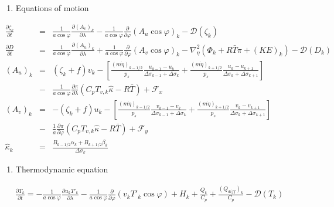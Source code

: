 \begin{enumerate}
\def\labelenumi{\arabic{enumi}.}
\setcounter{enumi}{2}
\tightlist
\item
  Equations of motion
\end{enumerate}
\begin{eqnarray}
  \frac{\partial \zeta_k}{\partial t} 
        &=&   \frac{1}{a\cos\varphi} 
            \frac{\partial (A_v)_k}{\partial \lambda}
          - \frac{1}{a\cos\varphi} 
            \frac{\partial }{\partial \varphi} (A_u \cos\varphi)_k
          - {\mathcal D}(\zeta_k) \\
  \frac{\partial D}{\partial t} 
        &=&   \frac{1}{a\cos\varphi} 
            \frac{\partial (A_u)_k}{\partial \lambda}
          + \frac{1}{a\cos\varphi} 
            \frac{\partial }{\partial \varphi} (A_v \cos\varphi)_k
          - \nabla^{2}_{\eta}
           ( \Phi_k + R\bar{T} \pi 
             + ({\mathit KE})_k )
          - {\mathcal D}(D_k) \\
  (A_u)_k
    &=&  ( \zeta_k + f ) v_k 
             - \left[ \frac{(m\dot{\eta})_{k-1/2}}{p_s} \frac{u_{k-1} - u_k}{\Delta\sigma_{k-1}+\Delta\sigma_k}
               + \frac{(m\dot{\eta})_{k+1/2}}{p_s} \frac{u_k   - u_{k+1}}{\Delta\sigma_{k}+\Delta\sigma_{k+1}} \right] \\
           &-& \frac{1}{a\cos\varphi} \frac{\partial \pi}{\partial \lambda}(C_p T_{v,k}\hat{\kappa}-R\bar{T})
             + {\mathcal F}_x \\
  (A_v)_k
    &=&  - ( \zeta_k + f ) u_k 
             - \left[ \frac{(m\dot{\eta})_{k-1/2}}{p_s} \frac{v_{k-1} - v_k}{\Delta\sigma_{k-1}+\Delta\sigma_k}
               + \frac{(m\dot{\eta})_{k+1/2}}{p_s} \frac{v_k   - v_{k+1}}{\Delta\sigma_{k}+\Delta\sigma_{k+1}} \right] \\
           &-& \frac{1}{a} \frac{\partial \pi}{\partial \varphi}(C_p T_{v,k}\hat{\kappa}-R\bar{T})
             + {\mathcal F}_y \\
   \hat{\kappa}_k 
    &=& \frac{ B_{k-1/2} \alpha_k + B_{k+1/2} \beta_k }
            { \Delta\sigma_k                                  } 
\end{eqnarray}

\begin{enumerate}
\def\labelenumi{\arabic{enumi}.}
\setcounter{enumi}{3}
\tightlist
\item
  Thermodynamic equation
\end{enumerate}
\begin{eqnarray}
  \frac{\partial T_k}{\partial t}
     =  - \frac{1}{a\cos\varphi}
               \frac{\partial u_k T'_k}{\partial \lambda}
          - \frac{1}{a\cos\varphi}
               \frac{\partial }{\partial \varphi} (v_k T'_k \cos\varphi)
          + H_k
        + \frac{Q_k}{C_{p}}
          + \frac{(Q_{diff})_k}{C_p} 
          - {\mathcal D}(T_k)
\end{eqnarray}

